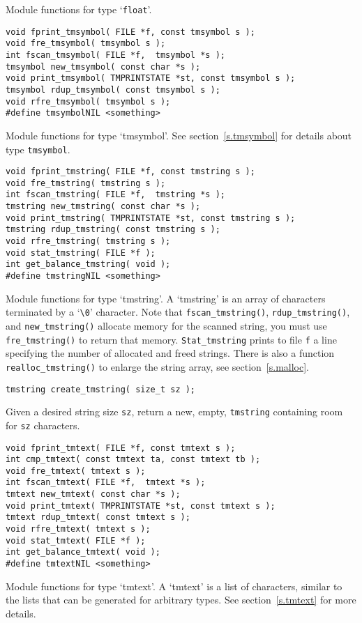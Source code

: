 \begin{desc}
Module functions for type `{\tt float}'.
\end{desc}
\begin{verbatim}
void fprint_tmsymbol( FILE *f, const tmsymbol s );
void fre_tmsymbol( tmsymbol s );
int fscan_tmsymbol( FILE *f,  tmsymbol *s );
tmsymbol new_tmsymbol( const char *s );
void print_tmsymbol( TMPRINTSTATE *st, const tmsymbol s );
tmsymbol rdup_tmsymbol( const tmsymbol s );
void rfre_tmsymbol( tmsymbol s );
#define tmsymbolNIL <something>
\end{verbatim}
\begin{desc}
Module functions for type `tmsymbol'.
See section~\ref{s.tmsymbol} for details about type \verb"tmsymbol".
\end{desc}
\begin{verbatim}
void fprint_tmstring( FILE *f, const tmstring s );
void fre_tmstring( tmstring s );
int fscan_tmstring( FILE *f,  tmstring *s );
tmstring new_tmstring( const char *s );
void print_tmstring( TMPRINTSTATE *st, const tmstring s );
tmstring rdup_tmstring( const tmstring s );
void rfre_tmstring( tmstring s );
void stat_tmstring( FILE *f );
int get_balance_tmstring( void );
#define tmstringNIL <something>
\end{verbatim}
\begin{desc}
Module functions for type `tmstring'.
A `tmstring' is an array of characters terminated by a `\verb+\0+' character.
Note that {\tt fscan\_tmstring()}, {\tt rdup\_tmstring()},
and {\tt new\_tmstring()} allocate memory for the scanned string,
you must use {\tt fre\_tmstring()} to return that memory.
{\tt Stat\_tmstring} prints to file {\tt f} a line specifying the number of
allocated and freed strings.
There is also a function \verb+realloc_tmstring()+ to enlarge the
string array,
see section~\ref{s.malloc}.
\end{desc}
\begin{verbatim}
tmstring create_tmstring( size_t sz );
\end{verbatim}
\begin{desc}
Given a desired string size \verb'sz', return a new, empty, {\tt tmstring}
containing room for \verb'sz' characters.
\end{desc}
\begin{verbatim}
void fprint_tmtext( FILE *f, const tmtext s );
int cmp_tmtext( const tmtext ta, const tmtext tb );
void fre_tmtext( tmtext s );
int fscan_tmtext( FILE *f,  tmtext *s );
tmtext new_tmtext( const char *s );
void print_tmtext( TMPRINTSTATE *st, const tmtext s );
tmtext rdup_tmtext( const tmtext s );
void rfre_tmtext( tmtext s );
void stat_tmtext( FILE *f );
int get_balance_tmtext( void );
#define tmtextNIL <something>
\end{verbatim}
\begin{desc}
Module functions for type `tmtext'.
A `tmtext' is a list of characters, similar to the lists that can be
generated for arbitrary types. See section~\ref{s.tmtext} for more details.
\end{desc}
